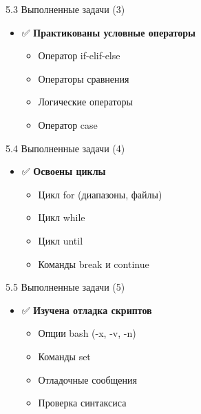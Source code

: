 \documentclass[
  ignorenonframetext,
  aspectratio=169,
  russian,
]{beamer}
\providecommand{\tightlist}{%
  \setlength{\itemsep}{0pt}\setlength{\parskip}{0pt}}
\begin{document}
\begin{frame}{5.3 Выполненные задачи (3)}
\label{ux432ux44bux43fux43eux43bux43dux435ux43dux43dux44bux435-ux437ux430ux434ux430ux447ux438-3}
\begin{itemize}[<+->]
\tightlist
\item
  ✅ \textbf{Практикованы условные операторы}

  \begin{itemize}[<+->]
  \tightlist
  \item
    Оператор if-elif-else
  \item
    Операторы сравнения
  \item
    Логические операторы
  \item
    Оператор case
  \end{itemize}
\end{itemize}
\end{frame}

\begin{frame}{5.4 Выполненные задачи (4)}
\label{ux432ux44bux43fux43eux43bux43dux435ux43dux43dux44bux435-ux437ux430ux434ux430ux447ux438-4}
\begin{itemize}[<+->]
\tightlist
\item
  ✅ \textbf{Освоены циклы}

  \begin{itemize}[<+->]
  \tightlist
  \item
    Цикл for (диапазоны, файлы)
  \item
    Цикл while
  \item
    Цикл until
  \item
    Команды break и continue
  \end{itemize}
\end{itemize}
\end{frame}

\begin{frame}{5.5 Выполненные задачи (5)}
\label{ux432ux44bux43fux43eux43bux43dux435ux43dux43dux44bux435-ux437ux430ux434ux430ux447ux438-5}
\begin{itemize}[<+->]
\tightlist
\item
  ✅ \textbf{Изучена отладка скриптов}

  \begin{itemize}[<+->]
  \tightlist
  \item
    Опции bash (-x, -v, -n)
  \item
    Команды set
  \item
    Отладочные сообщения
  \item
    Проверка синтаксиса
  \end{itemize}
\end{itemize}
\end{frame}
\end{document}
